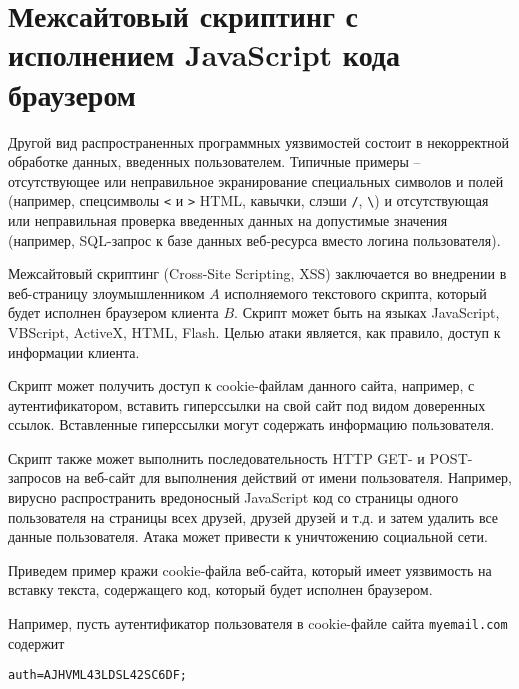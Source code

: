 \section[XSS-атака с исполнением кода браузером]{Межсайтовый скриптинг с \protect\\ исполнением JavaScript кода \protect\\ браузером}

Другой вид распространенных программных уязвимостей состоит в некорректной обработке данных, введенных пользователем. Типичные примеры -- отсутствующее или неправильное экранирование специальных символов и полей (например, спецсимволы \texttt{<} и \texttt{>} HTML, кавычки, слэши \texttt{/}, \texttt{\textbackslash}) и отсутствующая или неправильная проверка введенных данных на допустимые значения (например, SQL-запрос к базе данных веб-ресурса вместо логина пользователя).

Межсайтовый скриптинг (Cross-Site Scripting, XSS) заключается во внедрении в веб-страницу злоумышленником $A$ исполняемого текстового скрипта, который будет исполнен браузером клиента $B$. Скрипт может быть на языках JavaScript, VBScript, ActiveX, HTML, Flash. Целью атаки является, как правило, доступ к информации клиента.

Скрипт может получить доступ к cookie-файлам данного сайта, например, с аутентификатором, вставить гиперссылки на свой сайт под видом доверенных ссылок. Вставленные гиперссылки могут содержать информацию пользователя.

Скрипт также может выполнить последовательность HTTP GET- и POST-запросов на веб-сайт для выполнения действий от имени пользователя. Например, вирусно распространить вредоносный JavaScript код со страницы одного пользователя на страницы всех друзей, друзей друзей и т.д. и затем удалить все данные пользователя. Атака может привести к уничтожению социальной сети.

Приведем пример кражи cookie-файла веб-сайта, который имеет уязвимость на вставку текста, содержащего код, который будет исполнен браузером.


Например, пусть аутентификатор пользователя в cookie-файле сайта \texttt{myemail.com} содержит
\begin{center} \begin{verbatim}
auth=AJHVML43LDSL42SC6DF;
\end{verbatim} \end{center}

